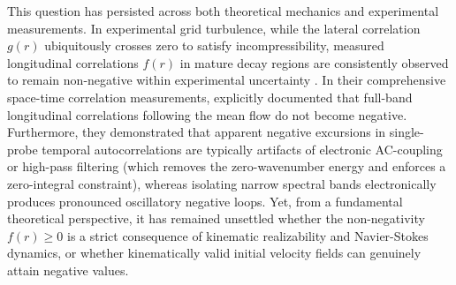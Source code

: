 \documentclass[lineno]{jfm}
\begin{document}
This question has persisted across both theoretical mechanics and experimental measurements. In experimental grid turbulence, while the lateral correlation $g(r)$ ubiquitously crosses zero to satisfy incompressibility, measured longitudinal correlations $f(r)$ in mature decay regions are consistently observed to remain non-negative within experimental uncertainty \citep{StewartTownsend1951, ComteBellotCorrsin1971, FrenkielKlebanoffHuang1979}. In their comprehensive space-time correlation measurements, \citet{ComteBellotCorrsin1971} explicitly documented that full-band longitudinal correlations following the mean flow do not become negative. Furthermore, they demonstrated that apparent negative excursions in single-probe temporal autocorrelations are typically artifacts of electronic AC-coupling or high-pass filtering (which removes the zero-wavenumber energy and enforces a zero-integral constraint), whereas isolating narrow spectral bands electronically produces pronounced oscillatory negative loops. Yet, from a fundamental theoretical perspective, it has remained unsettled whether the non-negativity $f(r) \ge 0$ is a strict consequence of kinematic realizability and Navier-Stokes dynamics, or whether kinematically valid initial velocity fields can genuinely attain negative values.
\end{document}
